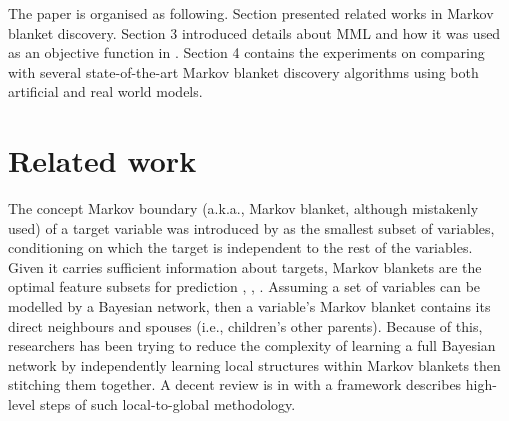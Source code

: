 The paper is organised as following. Section presented related works in Markov blanket discovery. Section 3 introduced details about MML and how it was used as an objective function in \mmlcpt. Section 4 contains the experiments on comparing \mmlcpt with several state-of-the-art Markov blanket discovery algorithms using both artificial and real world models. 
\fi 

\section{Related work} 
\label{sec:related}
The concept Markov boundary (a.k.a., Markov blanket, although mistakenly used) of a target variable was introduced by \cite{pearl1988probabilistic} as the smallest subset of variables, conditioning on which the target is independent to the rest of the variables. Given it carries sufficient information about targets, Markov blankets are the optimal feature subsets for prediction \cite{koller1996toward}, \cite{cooper1997evaluation}, \cite{cheng2001kdd}. Assuming a set of variables can be modelled by a Bayesian network, then a variable's Markov blanket contains its direct neighbours and spouses (i.e., children's other parents). Because of this, researchers has been trying to reduce the complexity of learning a full Bayesian network by independently learning local structures within Markov blankets then stitching them together. A decent review is in \cite{aliferis2010localb} with a framework describes high-level steps of such local-to-global methodology. %

